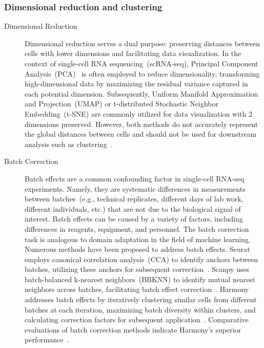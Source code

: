 \subsubsection{Dimensional reduction and clustering}
\label{background:sec2:dr_n_clustering}
\begin{description}
	\item[Dimensional Reduction]
	Dimensional reduction serves a dual purpose: preserving distances between cells with lower dimensions and facilitating data visualization. In the context of single-cell RNA sequencing~(scRNA-seq), Principal Component Analysis~(PCA)~\citep{hotelling1933pca} is often employed to reduce dimensionality, transforming high-dimensional data by maximizing the residual variance captured in each potential dimension. Subsequently, Uniform Manifold Approximation and Projection~(UMAP) or t-distributed Stochastic Neighbor Embedding~(t-SNE) are commonly utilized for data visualization with 2 dimensions preserved. However, both methods do not accurately represent the global distances between cells and should not be used for downstream analysis such as clustering~\citep{mcinnes2018umap, van2008tsne}.

	\item[Batch Correction]
	Batch effects are a common confounding factor in single-cell RNA-seq experiments. Namely, they are systematic differences in measurements between batches~(e.g., technical replicates, different days of lab work, different individuals, etc.) that are not due to the biological signal of interest. Batch effects can be caused by a variety of factors, including differences in reagents, equipment, and personnel. The batch correction task is analogous to domain adaptation in the field of machine learning. Numerous methods have been proposed to address batch effects. Seurat employs canonical correlation analysis~(CCA) to identify anchors between batches, utilizing these anchors for subsequent correction~\citep{stuart2019seurat3}. Scanpy uses batch-balanced k-nearest neighbors~(BBKNN) to identify mutual nearest neighbors across batches, facilitating batch effect correction~\citep{polanski2020bbknn}. Harmony addresses batch effects by iteratively clustering similar cells from different batches at each iteration, maximizing batch diversity within clusters, and calculating correction factors for subsequent application~\citep{korsunsky2019harmony}. Comparative evaluations of batch correction methods indicate Harmony's superior performance~\citep{tran2020benchmark}.



\end{description}
